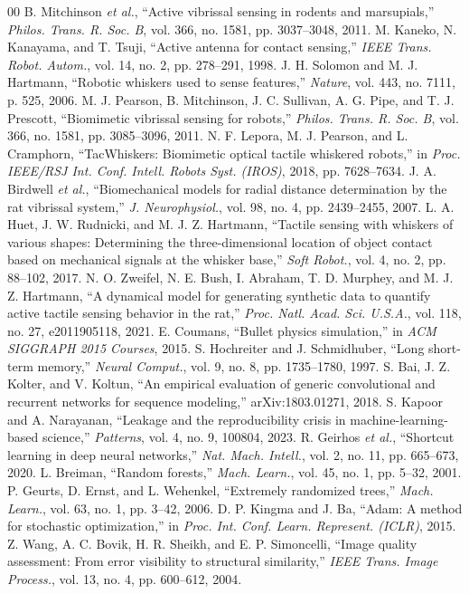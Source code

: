 \documentclass[conference]{IEEEtran}
\begin{document}
\begin{thebibliography}{00}
 B. Mitchinson \emph{et al.}, ``Active vibrissal sensing in rodents and marsupials,'' \emph{Philos. Trans. R. Soc. B}, vol. 366, no. 1581, pp. 3037--3048, 2011.
 M. Kaneko, N. Kanayama, and T. Tsuji, ``Active antenna for contact sensing,'' \emph{IEEE Trans. Robot. Autom.}, vol. 14, no. 2, pp. 278--291, 1998.
 J. H. Solomon and M. J. Hartmann, ``Robotic whiskers used to sense features,'' \emph{Nature}, vol. 443, no. 7111, p. 525, 2006.
 M. J. Pearson, B. Mitchinson, J. C. Sullivan, A. G. Pipe, and T. J. Prescott, ``Biomimetic vibrissal sensing for robots,'' \emph{Philos. Trans. R. Soc. B}, vol. 366, no. 1581, pp. 3085--3096, 2011.
 N. F. Lepora, M. J. Pearson, and L. Cramphorn, ``TacWhiskers: Biomimetic optical tactile whiskered robots,'' in \emph{Proc. IEEE/RSJ Int. Conf. Intell. Robots Syst. (IROS)}, 2018, pp. 7628--7634.
 J. A. Birdwell \emph{et al.}, ``Biomechanical models for radial distance determination by the rat vibrissal system,'' \emph{J. Neurophysiol.}, vol. 98, no. 4, pp. 2439--2455, 2007.
 L. A. Huet, J. W. Rudnicki, and M. J. Z. Hartmann, ``Tactile sensing with whiskers of various shapes: Determining the three-dimensional location of object contact based on mechanical signals at the whisker base,'' \emph{Soft Robot.}, vol. 4, no. 2, pp. 88--102, 2017.
 N. O. Zweifel, N. E. Bush, I. Abraham, T. D. Murphey, and M. J. Z. Hartmann, ``A dynamical model for generating synthetic data to quantify active tactile sensing behavior in the rat,'' \emph{Proc. Natl. Acad. Sci. U.S.A.}, vol. 118, no. 27, e2011905118, 2021.
 E. Coumans, ``Bullet physics simulation,'' in \emph{ACM SIGGRAPH 2015 Courses}, 2015.
 S. Hochreiter and J. Schmidhuber, ``Long short-term memory,'' \emph{Neural Comput.}, vol. 9, no. 8, pp. 1735--1780, 1997.
 S. Bai, J. Z. Kolter, and V. Koltun, ``An empirical evaluation of generic convolutional and recurrent networks for sequence modeling,'' arXiv:1803.01271, 2018.
 S. Kapoor and A. Narayanan, ``Leakage and the reproducibility crisis in machine-learning-based science,'' \emph{Patterns}, vol. 4, no. 9, 100804, 2023.
 R. Geirhos \emph{et al.}, ``Shortcut learning in deep neural networks,'' \emph{Nat. Mach. Intell.}, vol. 2, no. 11, pp. 665--673, 2020.
 L. Breiman, ``Random forests,'' \emph{Mach. Learn.}, vol. 45, no. 1, pp. 5--32, 2001.
 P. Geurts, D. Ernst, and L. Wehenkel, ``Extremely randomized trees,'' \emph{Mach. Learn.}, vol. 63, no. 1, pp. 3--42, 2006.
 D. P. Kingma and J. Ba, ``Adam: A method for stochastic optimization,'' in \emph{Proc. Int. Conf. Learn. Represent. (ICLR)}, 2015.
 Z. Wang, A. C. Bovik, H. R. Sheikh, and E. P. Simoncelli, ``Image quality assessment: From error visibility to structural similarity,'' \emph{IEEE Trans. Image Process.}, vol. 13, no. 4, pp. 600--612, 2004.
\end{thebibliography}
\end{document}
